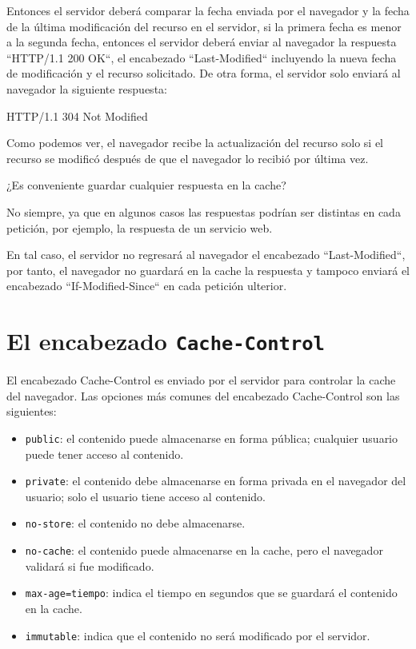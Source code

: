 Entonces el servidor deberá comparar la fecha enviada por el navegador y la fecha de la última modificación del recurso en el servidor, si la primera fecha es menor a la segunda fecha, entonces el servidor deberá enviar al navegador la respuesta ``HTTP/1.1 200 OK``, el encabezado ``Last-Modified`` incluyendo la nueva fecha de modificación y el recurso solicitado. De otra forma, el servidor solo enviará al navegador la siguiente respuesta:

\begin{SourceCode}
HTTP/1.1 304 Not Modified
\end{SourceCode}

Como podemos ver, el navegador recibe la actualización del recurso solo si el recurso se modificó después de que el navegador lo recibió por última vez.

¿Es conveniente guardar cualquier respuesta en la cache?

No siempre, ya que en algunos casos las respuestas podrían ser distintas en cada petición, por ejemplo, la respuesta de un servicio web.

En tal caso, el servidor no regresará al navegador el encabezado ``Last-Modified``, por tanto, el navegador no guardará en la cache la respuesta y tampoco enviará el encabezado ``If-Modified-Since`` en cada petición ulterior.

\section{El encabezado \texttt{Cache-Control}}

El encabezado Cache-Control es enviado por el servidor para controlar la cache del navegador.
Las opciones más comunes del encabezado Cache-Control son las siguientes:

\begin{itemize}

\item \texttt{public}: el contenido puede almacenarse en forma pública; cualquier usuario puede tener acceso al contenido.

\item \texttt{private}: el contenido debe almacenarse en forma privada en el navegador del usuario; solo el usuario tiene acceso al contenido.

\item \texttt{no-store}: el contenido no debe almacenarse.

\item \texttt{no-cache}: el contenido puede almacenarse en la cache, pero el navegador validará si fue modificado.

\item \texttt{max-age=tiempo}: indica el tiempo en segundos que se guardará el contenido en la cache.

\item \texttt{immutable}: indica que el contenido no será modificado por el servidor.

\end{itemize}

